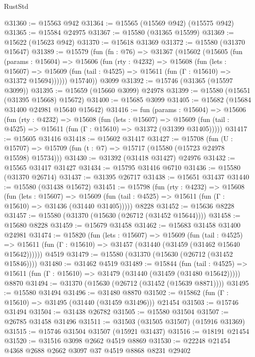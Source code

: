 \begin{lexlean}{RustStd}
\begin{coremodule}
@31360 := @15563 @942
@31364 := @15565 (@15569 @942) (@15575 @942)
@31365 := @15584 @24975
@31367 := @15580 (@31365 @15599)
@31369 := @15622 (@15623 @942)
@31370 := @15618 @31369
@31372 := @15580 (@31370 @15647)
@31389 := @15579
    (fun (fn : @76) =>
    @31367
      (@15602
        (@15605
          (fun (params : @15604) =>
          @15606
            (fun (rty : @4232) =>
            @15608
              (fun (lets : @15607) =>
              @15609 (fun (tail : @4525) => @15611 (fun (Γ : @15610) => @31372 @15694))))))
        @15740))
    @3099
@31392 := @15746 (@31365 (@15597 @3099))
@31395 := @15659 (@15660 @3099) @24978
@31399 := @15580 (@15651 (@31395 @15668) @15672)
@31400 := @15685 @3099
@31405 := @15682 (@15684 @31400 @24981 @15640 @15642)
@31416 := fun (params : @15604) =>
  @15606
    (fun (rty : @4232) =>
    @15608
      (fun (lets : @15607) =>
      @15609 (fun (tail : @4525) => @15611 (fun (Γ : @15610) => @31372 (@31399 @31405)))))
@31417 := @15605 @31416
@31418 := @15602 @31417
@31427 := @15708
    (fun (U : @15707) => @15709 (fun (t : @7) => @15717 (@15580 (@15723 @24978 @15598) @15734)))
@31430 := @31392 (@31418 @31427) @24976
@31432 := @15565 @31417 @31427
@31434 := @15795 @31416 @6710
@31436 := @15580 (@31370 @26714)
@31437 := @31395 @26717
@31438 := @15651 @31437
@31440 := @15580 (@31438 @15672)
@31451 := @15798
    (fun (rty : @4232) =>
    @15608
      (fun (lets : @15607) =>
      @15609 (fun (tail : @4525) => @15611 (fun (Γ : @15610) => @31436 (@31440 @31405)))))
    @8228
@31452 := @15636 @8228
@31457 := @15580 (@31370 (@15630 (@26712 (@31452 @15644))))
@31458 := @15680 @8228
@31459 := @15679 @31458
@31462 := @15683 @31458 @31400 @24981
@31474 := @15820
    (fun (lets : @15607) =>
    @15609
      (fun (tail : @4525) =>
      @15611 (fun (Γ : @15610) => @31457 (@31440 (@31459 (@31462 @15640 @15642))))))
    @4519
@31479 := @15580 (@31370 (@15630 (@26712 (@31452 @15846))))
@31480 := @31462 @4519
@31489 := @15844
    (fun (tail : @4525) => @15611 (fun (Γ : @15610) => @31479 (@31440 (@31459 (@31480 @15642)))))
    @8870
@31494 := @31370 (@15630 (@26712 (@31452 (@15639 @8871))))
@31495 := @15580 @31494
@31496 := @31480 @8870
@31502 := @15862 (fun (Γ : @15610) => @31495 (@31440 (@31459 @31496))) @21454
@31503 := @15746 @31494
@31504 := @31438 @26782
@31505 := @15580 @31504
@31507 := @26785 @31458 @31496
@31511 := @31503 (@31505 @31507) (@15916 @31369)
@31515 := @15746 @31504 @31507 (@15921 @31437)
@31516 := @18191 @21454
@31520 := @31516 @3098 @2662 @4519 @8869
@31530 := @22248 @21454 @4368 @2688 @2662 @3097 @37 @4519 @8868 @8231 @29402

\end{coremodule}
\end{lexlean}
